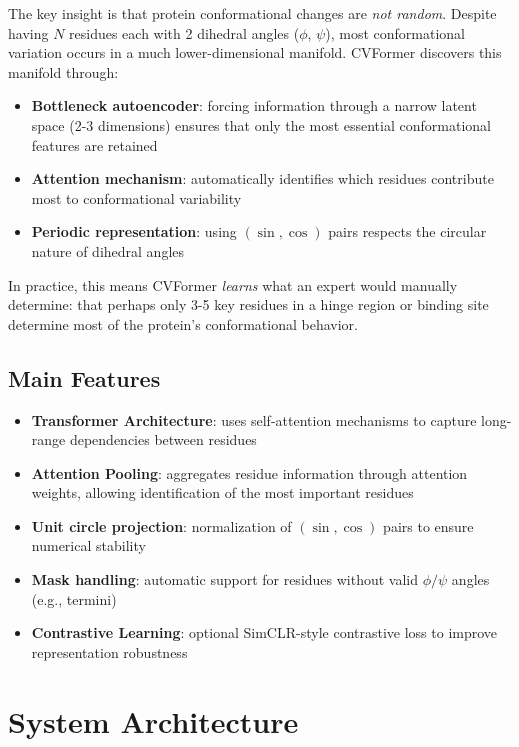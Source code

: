\documentclass[12pt,a4paper]{article}
\begin{document}
The key insight is that protein conformational changes are \textit{not random}. Despite having $N$ residues each with 2 dihedral angles ($\phi$, $\psi$), most conformational variation occurs in a much lower-dimensional manifold. CVFormer discovers this manifold through:

\begin{itemize}
    \item \textbf{Bottleneck autoencoder}: forcing information through a narrow latent space (2-3 dimensions) ensures that only the most essential conformational features are retained
    \item \textbf{Attention mechanism}: automatically identifies which residues contribute most to conformational variability
    \item \textbf{Periodic representation}: using $(\sin, \cos)$ pairs respects the circular nature of dihedral angles
\end{itemize}

In practice, this means CVFormer \textit{learns} what an expert would manually determine: that perhaps only 3-5 key residues in a hinge region or binding site determine most of the protein's conformational behavior.

\subsection{Main Features}
\begin{itemize}
    \item \textbf{Transformer Architecture}: uses self-attention mechanisms to capture long-range dependencies between residues
    \item \textbf{Attention Pooling}: aggregates residue information through attention weights, allowing identification of the most important residues
    \item \textbf{Unit circle projection}: normalization of $(\sin, \cos)$ pairs to ensure numerical stability
    \item \textbf{Mask handling}: automatic support for residues without valid $\phi/\psi$ angles (e.g., termini)
    \item \textbf{Contrastive Learning}: optional SimCLR-style contrastive loss to improve representation robustness
\end{itemize}

\section{System Architecture}
\end{document}
